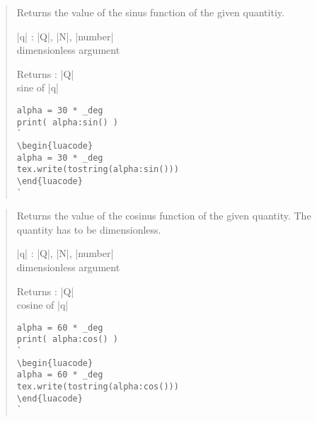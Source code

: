 \documentclass{ltxdoc}
\begin{document}
\begin{quote}
  Returns the value of the sinus function of the given quantitiy.

  \begin{description}
  \item |q| : |Q|, |N|, |number|\\
    dimensionless argument

  \item Returns : |Q|\\
    sine of |q|
  \end{description}

\begin{lstlisting}
alpha = 30 * _deg
print( alpha:sin() )
`
\begin{luacode}
alpha = 30 * _deg
tex.write(tostring(alpha:sin()))
\end{luacode}
`
\end{lstlisting}

\end{quote}



\begin{quote}
  Returns the value of the cosinus function of the given quantity. The quantity has to be dimensionless.

  \begin{description}
  \item |q| : |Q|, |N|, |number|\\
    dimensionless argument

  \item Returns : |Q|\\
    cosine of |q|
  \end{description}

\begin{lstlisting}
alpha = 60 * _deg
print( alpha:cos() )
`
\begin{luacode}
alpha = 60 * _deg
tex.write(tostring(alpha:cos()))
\end{luacode}
`
\end{lstlisting}

\end{quote}
\end{document}
